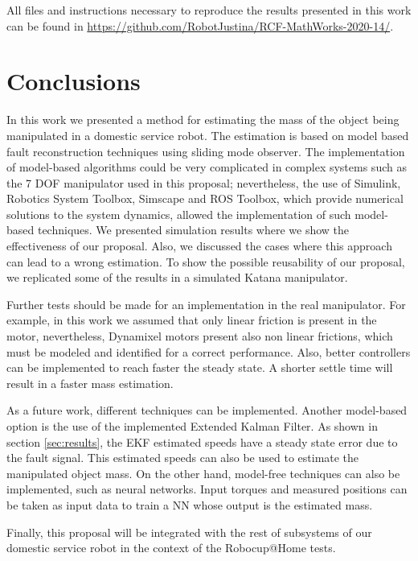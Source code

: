 \documentclass[a4paper, 10pt]{article}
\begin{document}
All files and instructions necessary to reproduce the results presented in this work can be found in \url{https://github.com/RobotJustina/RCF-MathWorks-2020-14/}. 

\section{Conclusions}
\label{sec:conclusions}
In this work we presented a method for estimating the mass of the object being manipulated in a domestic service robot. The estimation is based on model based fault reconstruction techniques using sliding mode observer. The implementation of model-based algorithms could be very complicated in complex systems such as the 7 DOF manipulator used in this proposal; nevertheless, the use of Simulink, Robotics System Toolbox, Simscape and ROS Toolbox, which provide numerical solutions to the system dynamics, allowed the implementation of such model-based techniques. We presented simulation results where we show the effectiveness of our proposal. Also, we discussed the cases where this approach can lead to a wrong estimation. To show the possible reusability of our proposal, we replicated some of the results in a simulated Katana manipulator. 

Further tests should be made for an implementation in the real manipulator. For example, in this work we assumed that only linear friction is present in the motor, nevertheless, Dynamixel motors present also non linear frictions, which must be modeled and identified for a correct performance. Also, better controllers can be implemented to reach faster the steady state. A shorter settle time will result in a faster mass estimation. 

As a future work, different techniques can be implemented. Another model-based option is the use of the implemented Extended Kalman Filter. As shown in section \ref{sec:results}, the EKF estimated speeds have a steady state error due to the fault signal. This estimated speeds can also be used to estimate the manipulated object mass. On the other hand, model-free techniques can also be implemented, such as neural networks. Input torques and measured positions can be taken as input data to train a NN whose output is the estimated mass.

Finally, this proposal will be integrated with the rest of subsystems of our domestic service robot in the context of the Robocup@Home tests. 




\end{document}
